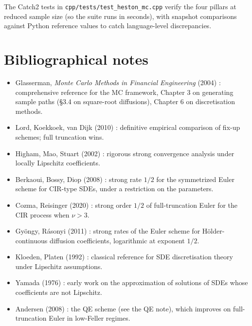 \documentclass[11pt]{article}
\theoremstyle{plain}
\theoremstyle{definition}
\theoremstyle{remark}
\begin{document}
The Catch2 tests in \texttt{cpp/tests/test\_heston\_mc.cpp} verify the four pillars at reduced sample size (so the suite runs in seconds), with snapshot comparisons against Python reference values to catch language-level discrepancies.

\section{Bibliographical notes}

\begin{itemize}[topsep=2pt]
    \item Glasserman, \emph{Monte Carlo Methods in Financial Engineering} (2004) \cite{Glasserman2004}: comprehensive reference for the MC framework, Chapter 3 on generating sample paths (\S3.4 on square-root diffusions), Chapter 6 on discretisation methods.
    \item Lord, Koekkoek, van Dijk (2010) \cite{LKvD2010}: definitive empirical comparison of fix-up schemes; full truncation wins.
    \item Higham, Mao, Stuart (2002) \cite{HighamMaoStuart2002}: rigorous strong convergence analysis under locally Lipschitz coefficients.
    \item Berkaoui, Bossy, Diop (2008) \cite{BerkaouiBossyDiop2008}: strong rate $1/2$ for the symmetrized Euler scheme for CIR-type SDEs, under a restriction on the parameters.
    \item Cozma, Reisinger (2020) \cite{CozmaReisinger2020}: strong order $1/2$ of full-truncation Euler for the CIR process when $\nu > 3$.
    \item Gy\"ongy, R\'asonyi (2011) \cite{GyongyRasonyi2011}: strong rates of the Euler scheme for H\"older-continuous diffusion coefficients, logarithmic at exponent $1/2$.
    \item Kloeden, Platen (1992) \cite{KloedenPlaten1992}: classical reference for SDE discretisation theory under Lipschitz assumptions.
    \item Yamada (1976) \cite{Yamada1976}: early work on the approximation of solutions of SDEs whose coefficients are not Lipschitz.
    \item Andersen (2008) \cite{Andersen2008}: the QE scheme (see the QE note), which improves on full-truncation Euler in low-Feller regimes.
\end{itemize}
\end{document}
